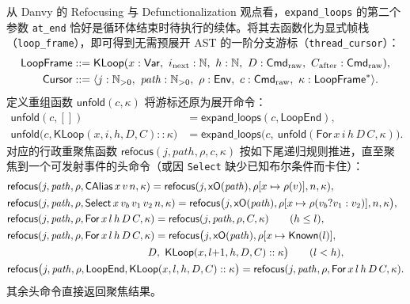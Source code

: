 \documentclass[UTF8,a4paper,11pt,fontset=fandol]{ctexart}
\newcommand{\code}[1]{\texttt{#1}}
\newcommand{\kw}[1]{\mathsf{#1}}
\begin{document}
从 Danvy 的 Refocusing 与 Defunctionalization 观点看，\code{expand\_loops} 的第二个参数 \code{at\_end} 恰好是循环体结束时待执行的续体。将其去函数化为显式帧栈（\code{loop\_frame}），即可得到无需预展开 AST 的一阶分支游标（\code{thread\_cursor}）：
\[
\begin{aligned}
\mathsf{LoopFrame} &::= \kw{KLoop}(x : \mathsf{Var},\ i_{\rm next} : \mathbb N,\ h : \mathbb N,\ D : \mathsf{Cmd}_{\rm raw},\ C_{\rm after} : \mathsf{Cmd}_{\rm raw}),\\
\mathsf{Cursor} &::= \langle j : \mathbb N_{>0},\ \mathit{path} : \mathbb N_{>0},\ \rho : \mathsf{Env},\ c : \mathsf{Cmd}_{\rm raw},\ \kappa : \mathsf{LoopFrame}^* \rangle.
\end{aligned}
\]
定义重组函数 $\kw{unfold}(c, \kappa)$ 将游标还原为展开命令：
\[
\begin{aligned}
\kw{unfold}(c, []) &= \kw{expand\_loops}(c, \kw{LoopEnd}),\\
\kw{unfold}\bigl(c, \kw{KLoop}(x, i, h, D, C) :: \kappa\bigr)
  &= \kw{expand\_loops}\bigl(c,\ \kw{unfold}(\kw{For}\,x\,i\,h\,D\,C, \kappa)\bigr).
\end{aligned}
\]
对应的行政重聚焦函数 $\kw{refocus}(j, \mathit{path}, \rho, c, \kappa)$ 按如下尾递归规则推进，直至聚焦到一个可发射事件的头命令（或因 \code{Select} 缺少已知布尔条件而卡住）：
\[
\begin{aligned}
&\kw{refocus}(j, \mathit{path}, \rho, \kw{CAlias}\,x\,v\,n, \kappa)
  = \kw{refocus}(j, \kw{xO}(\mathit{path}), \rho[x \mapsto \rho(v)], n, \kappa),\\
&\kw{refocus}(j, \mathit{path}, \rho, \kw{Select}\,x\,v_b\,v_1\,v_2\,n, \kappa)
  = \kw{refocus}\bigl(j, \kw{xO}(\mathit{path}), \rho[x \mapsto \rho(v_b ? v_1 : v_2)], n, \kappa\bigr),\\
&\kw{refocus}(j, \mathit{path}, \rho, \kw{For}\,x\,l\,h\,D\,C, \kappa)
  = \kw{refocus}(j, \mathit{path}, \rho, C, \kappa) \qquad (h \le l),\\
&\kw{refocus}(j, \mathit{path}, \rho, \kw{For}\,x\,l\,h\,D\,C, \kappa)
  = \kw{refocus}\bigl(j, \kw{xO}(\mathit{path}), \rho[x \mapsto \kw{Known}(l)],\\
  &\hspace{13.5em} D,\ \kw{KLoop}(x, l{+}1, h, D, C)::\kappa\bigr) \qquad (l < h),\\
&\kw{refocus}\bigl(j, \mathit{path}, \rho, \kw{LoopEnd}, \kw{KLoop}(x, l, h, D, C)::\kappa\bigr)
  = \kw{refocus}(j, \mathit{path}, \rho, \kw{For}\,x\,l\,h\,D\,C, \kappa).
\end{aligned}
\]
其余头命令直接返回聚焦结果。
\end{document}
